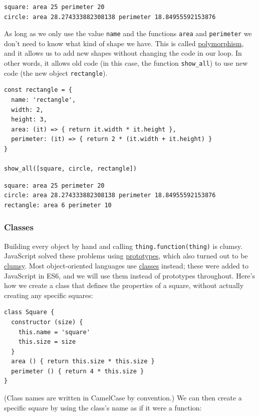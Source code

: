 \begin{verbatim}
square: area 25 perimeter 20
circle: area 28.274333882308138 perimeter 18.84955592153876
\end{verbatim}

As long as we only use the value \texttt{name} and the functions
\texttt{area} and \texttt{perimeter} we don't need to know what kind of
shape we have. This is called
\protect\hyperlink{g:polymorphism}{polymorphism}, and it allows us to
add new shapes without changing the code in our loop. In other words, it
allows old code (in this case, the function \texttt{show\_all}) to use
new code (the new object \texttt{rectangle}).

\begin{verbatim}
const rectangle = {
  name: 'rectangle',
  width: 2,
  height: 3,
  area: (it) => { return it.width * it.height },
  perimeter: (it) => { return 2 * (it.width + it.height) }
}

show_all([square, circle, rectangle])
\end{verbatim}

\begin{verbatim}
square: area 25 perimeter 20
circle: area 28.274333882308138 perimeter 18.84955592153876
rectangle: area 6 perimeter 10
\end{verbatim}

\subsubsection{Classes}\label{s:oop-classes}

Building every object by hand and calling \texttt{thing.function(thing)}
is clumsy. JavaScript solved these problems using
\protect\hyperlink{g:prototype}{prototypes}, which also turned out to be
\protect\hyperlink{s:legacy-prototypes}{clumsy}. Most object-oriented
languages use \protect\hyperlink{g:class}{classes} instead; these were
added to JavaScript in ES6, and we will use them instead of prototypes
throughout. Here's how we create a class that defines the properties of
a square, without actually creating any specific squares:

\begin{verbatim}
class Square {
  constructor (size) {
    this.name = 'square'
    this.size = size
  }
  area () { return this.size * this.size }
  perimeter () { return 4 * this.size }
}
\end{verbatim}

(Class names are written in CamelCase by convention.) We can then create
a specific square by using the class's name as if it were a function:

